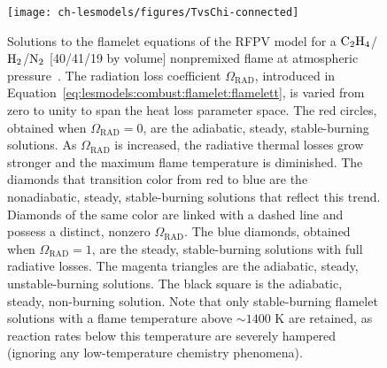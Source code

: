 \begin{figure}[htb]
  \begin{center}
    \texttt{[image: ch-lesmodels/figures/TvsChi-connected]}
    \caption[Flamelet Solutions of RFPV Model, $T|Z_{st}$ vs. $\chi|Z_{st}$]{Solutions to the flamelet equations of the RFPV model for a $\ce{C2H4}$/$\ce{H2}$/$\ce{N2}$ [40/41/19 by volume] nonpremixed flame at atmospheric pressure~\cite{mahmoud2017}. The radiation loss coefficient $\Omega_{\text{RAD}}$, introduced in Equation~\ref{eq:lesmodels:combust:flamelet:flamelett}, is varied from zero to unity to span the heat loss parameter space. The red circles, obtained when $\Omega_{\text{RAD}} = 0$, are the adiabatic, steady, stable-burning solutions. As $\Omega_{\text{RAD}}$ is increased, the radiative thermal losses grow stronger and the maximum flame temperature is diminished. The diamonds that transition color from red to blue are the nonadiabatic, steady, stable-burning solutions that reflect this trend. Diamonds of the same color are linked with a dashed line and possess a distinct, nonzero $\Omega_{\text{RAD}}$. The blue diamonds, obtained when $\Omega_{\text{RAD}} = 1$, are the steady, stable-burning solutions with full radiative losses. The magenta triangles are the adiabatic, steady, unstable-burning solutions. The black square is the adiabatic, steady, non-burning solution. Note that only stable-burning flamelet solutions with a flame temperature above $\sim 1400$ K are retained, as reaction rates below this temperature are severely hampered (ignoring any low-temperature chemistry phenomena).}
    \label{fig:lesmodels:combust:flamelet:tvschi}
  \end{center}
\end{figure}
